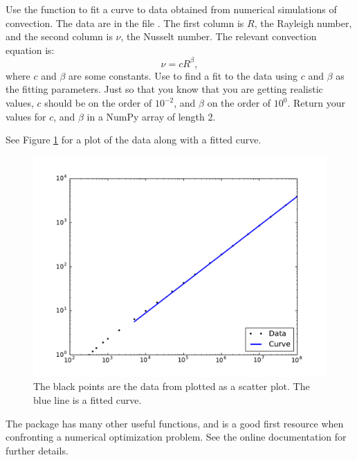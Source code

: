 \begin{problem}
Use the  function to fit a curve to data obtained from numerical simulations of convection.
The data are in the file . 
The first column is $R$, the Rayleigh number, and the second column is $\nu$, the Nusselt number.
The relevant convection equation is:
\[
\nu = cR^\beta,
\]
where $c$ and $\beta$ are some constants. 
Use  to find a fit to the data using $c$ and $\beta$ as the fitting parameters.
Just so that you know that you are getting realistic values, $c$ should be on the order of $10^{-2}$, and $\beta$ on the order of $10^{0}$.
Return your values for $c$, and $\beta$ in a NumPy array of length 2.

See Figure \ref{opt:ConvectionFit} for a plot of the data along with a fitted curve.
\end{problem}

\begin{figure}
\includegraphics[width=\textwidth]{ConvectionFit.pdf}
\caption{The black points are the data from  plotted as a scatter plot. The blue line is a fitted curve.}
\label{opt:ConvectionFit}
\end{figure}

The  package has many other useful functions, and is a good first resource when confronting a numerical optimization problem. 
See the online documentation for further details.
